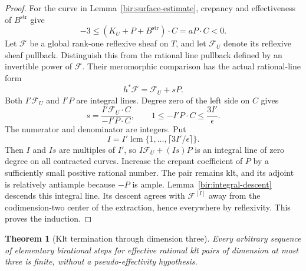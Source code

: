 \documentclass[11pt,letterpaper]{article}
\newtheorem{theorem}{Theorem}[section]
\theoremstyle{definition}
\theoremstyle{remark}
\begin{document}
\begin{proof}
For the curve in Lemma~\ref{bir:surface-estimate}, crepancy and
effectiveness of $B^{\mathrm{str}}$ give
\begin{equation}
 -3\leq (K_U+P+B^{\mathrm{str}})\cdot C
       =aP\cdot C<0.
 \label{bir:index-degree}
\end{equation}
Let $\mathcal F$ be a global rank-one reflexive sheaf on $T$, and
let $\mathcal F_U$ denote its reflexive sheaf pullback.  Distinguish
this from the rational line pullback defined by an invertible power
of $\mathcal F$.  Their meromorphic comparison has the actual
rational-line form
\begin{equation}
 h^*\mathcal F=\mathcal F_U+sP.
 \label{bir:index-correction}
\end{equation}
Both $I'\mathcal F_U$ and $I'P$ are integral lines.  Degree zero of
the left side on $C$ gives
\begin{equation}
 s=\frac{I'\mathcal F_U\cdot C}{-I'P\cdot C},
 \qquad 1\leq -I'P\cdot C\leq\frac{3I'}{\epsilon}.
 \label{bir:index-denominator}
\end{equation}
The numerator and denominator are integers.  Put
\begin{equation}
 I=I'\operatorname{lcm}
       \{1,\ldots,\lceil3I'/\epsilon\rceil\}.
 \label{bir:index-recursion}
\end{equation}
Then $I$ and $Is$ are multiples of $I'$, so
$I\mathcal F_U+(Is)P$ is an integral line of zero degree on all
contracted curves.  Increase the crepant coefficient of $P$ by a
sufficiently small positive rational number.  The pair remains klt,
and its adjoint is relatively antiample because $-P$ is ample.
Lemma~\ref{bir:integral-descent} descends this integral line.  Its
descent agrees with $\mathcal F^{[I]}$ away from the codimension-two
center of the extraction, hence everywhere by reflexivity.  This
proves the induction.
\end{proof}

\begin{theorem}[Klt termination through dimension three]
\label{bir:klt-termination}
Every arbitrary sequence of elementary birational steps for effective
rational klt pairs of dimension at most three is finite, without a
pseudo-effectivity hypothesis.
\end{theorem}
\end{document}
